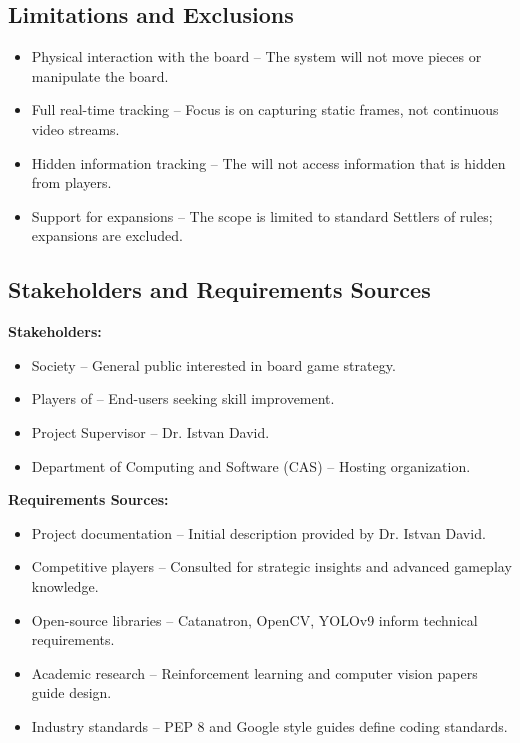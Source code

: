 \documentclass{article}
\begin{document}
\subsection{Limitations and Exclusions}\label{subsec:limitations-and-exclusions}
\begin{itemize}
    \item {Physical interaction with the board} – The system will not move pieces or manipulate the board.
    \item {Full real-time tracking} – Focus is on capturing static frames, not continuous video streams.
    \item {Hidden information tracking} – The \AI{} will not access information that is hidden from players.
    \item {Support for expansions} – The scope is limited to standard Settlers of \emph{\Catan{}} rules; expansions are excluded.
\end{itemize}

\subsection{Stakeholders and Requirements Sources}\label{subsec:stakeholders-and-requirements-sources}
\textbf{Stakeholders:}
\begin{itemize}
    \item Society – General public interested in board game strategy.
    \item Players of \emph{\Catan{}} – End-users seeking skill improvement.
    \item Project Supervisor – Dr. Istvan David.
    \item Department of Computing and Software (CAS) – Hosting organization.
\end{itemize}

\noindent\textbf{Requirements Sources:}
\begin{itemize}
    \item Project documentation – Initial description provided by Dr. Istvan David.
    \item Competitive \emph{\Catan{}} players – Consulted for strategic insights and advanced gameplay knowledge.
    \item Open-source libraries – Catanatron, OpenCV, YOLOv9 inform technical requirements.
    \item Academic research – Reinforcement learning and computer vision papers guide \AI{} design.
    \item Industry standards – PEP 8 and Google style guides define coding standards.
\end{itemize}
\end{document}

